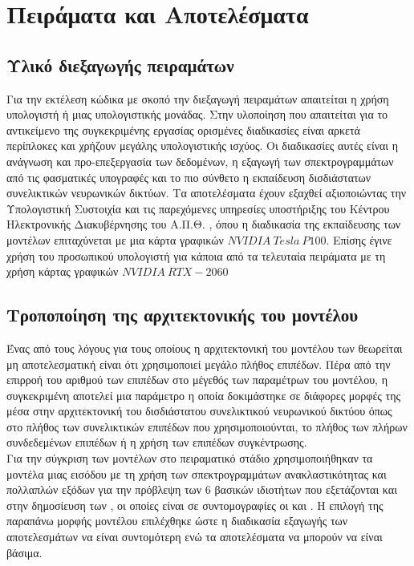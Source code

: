 \chapter{Πειράματα και Αποτελέσματα}
\label{ch:experiments_and_results}

\section{Υλικό διεξαγωγής πειραμάτων}
Για την εκτέλεση κώδικα με σκοπό την διεξαγωγή πειραμάτων απαιτείται η χρήση υπολογιστή ή μιας υπολογιστικής μονάδας. Στην υλοποίηση που απαιτείται για το αντικείμενο της συγκεκριμένης εργασίας ορισμένες διαδικασίες είναι αρκετά περίπλοκες και χρήζουν μεγάλης υπολογιστικής ισχύος. Οι διαδικασίες αυτές είναι η ανάγνωση και προ-επεξεργασία των δεδομένων, η εξαγωγή των σπεκτρογραμμάτων από τις φασματικές υπογραφές και το πιο σύνθετο η εκπαίδευση δισδιάστατων συνελικτικών νευρωνικών δικτύων.
Τα αποτελέσματα έχουν εξαχθεί αξιοποιώντας την Υπολογιστική Συστοιχία και τις παρεχόμενες υπηρεσίες υποστήριξης του Κέντρου Ηλεκτρονικής Διακυβέρνησης του Α.Π.Θ. \cite{hpcauth}, όπου η διαδικασία της εκπαίδευσης των μοντέλων επιταχύνεται με μια κάρτα γραφικών $NVIDIA~Tesla~P100$. Επίσης έγινε χρήση του προσωπικού υπολογιστή για κάποια από τα τελευταία πειράματα με τη χρήση κάρτας γραφικών $NVIDIA~RTX-2060$

\section{Τροποποίηση της αρχιτεκτονικής του μοντέλου}
Ένας από τους λόγους για τους οποίους η αρχιτεκτονική του μοντέλου των  θεωρείται μη αποτελεσματική είναι ότι χρησιμοποιεί μεγάλο πλήθος επιπέδων. Πέρα από την επιρροή του αριθμού των επιπέδων στο μέγεθός των παραμέτρων του μοντέλου, η συγκεκριμένη αποτελεί μια παράμετρο η οποία δοκιμάστηκε σε διάφορες μορφές της μέσα στην αρχιτεκτονική του δισδιάστατου συνελικτικού νευρωνικού δικτύου όπως στο πλήθος των συνελικτικών επιπέδων που χρησιμοποιούνται, το πλήθος των πλήρων συνδεδεμένων επιπέδων ή η χρήση των επιπέδων συγκέντρωσης.\\

Για την σύγκριση των μοντέλων στο πειραματικό στάδιο χρησιμοποιήθηκαν τα μοντέλα μιας εισόδου με τη χρήση των σπεκτρογραμμάτων ανακλαστικότητας και πολλαπλών εξόδων για την πρόβλεψη των 6 βασικών ιδιοτήτων που εξετάζονται και στην δημοσίευση των , οι οποίες είναι σε συντομογραφίες οι  και . Η επιλογή της παραπάνω μορφής μοντέλου επιλέχθηκε ώστε η διαδικασία εξαγωγής των αποτελεσμάτων να είναι συντομότερη ενώ τα αποτελέσματα να μπορούν να είναι βάσιμα.\\

